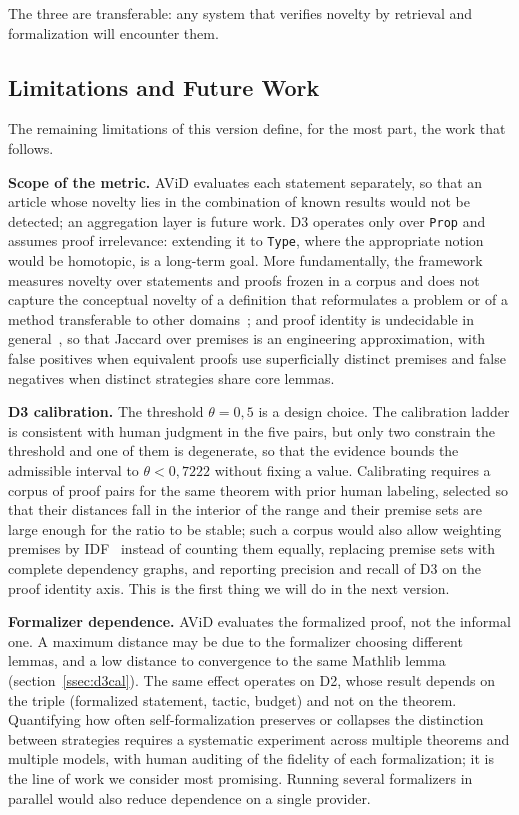 \documentclass[12pt,a4paper]{article}
\theoremstyle{remark}
\begin{document}
The three are transferable: any system that verifies novelty by retrieval and formalization will encounter them.

\subsection{Limitations and Future Work}
\label{sec:limitaciones}

The remaining limitations of this version define, for the most part, the work that follows.

\textbf{Scope of the metric.} AViD evaluates each statement separately, so that an article whose novelty lies in the combination of known results would not be detected; an aggregation layer is future work. D3 operates only over \texttt{Prop} and assumes proof irrelevance: extending it to \texttt{Type}, where the appropriate notion would be homotopic, is a long-term goal. More fundamentally, the framework measures novelty over statements and proofs frozen in a corpus and does not capture the conceptual novelty of a definition that reformulates a problem or of a method transferable to other domains~\cite{lakatos1976}; and proof identity is undecidable in general~\cite{dosen2003}, so that Jaccard over premises is an engineering approximation, with false positives when equivalent proofs use superficially distinct premises and false negatives when distinct strategies share core lemmas.

\textbf{D3 calibration.} The threshold $\theta = 0{,}5$ is a design choice. The calibration ladder is consistent with human judgment in the five pairs, but only two constrain the threshold and one of them is degenerate, so that the evidence bounds the admissible interval to $\theta < 0{,}7222$ without fixing a value. Calibrating requires a corpus of proof pairs for the same theorem with prior human labeling, selected so that their distances fall in the interior of the range and their premise sets are large enough for the ratio to be stable; such a corpus would also allow weighting premises by IDF~\cite{huch2022} instead of counting them equally, replacing premise sets with complete dependency graphs, and reporting precision and recall of D3 on the proof identity axis. This is the first thing we will do in the next version.

\textbf{Formalizer dependence.} AViD evaluates the formalized proof, not the informal one. A maximum distance may be due to the formalizer choosing different lemmas, and a low distance to convergence to the same Mathlib lemma (section~\ref{ssec:d3cal}). The same effect operates on D2, whose result depends on the triple (formalized statement, tactic, budget) and not on the theorem. Quantifying how often self-formalization preserves or collapses the distinction between strategies requires a systematic experiment across multiple theorems and multiple models, with human auditing of the fidelity of each formalization; it is the line of work we consider most promising. Running several formalizers in parallel would also reduce dependence on a single provider.
\end{document}
